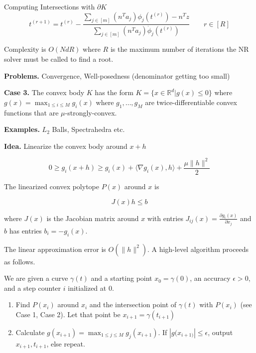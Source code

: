 \documentclass{beamer}
\begin{document}
\begin{frame}[allowframebreaks]{Computing Intersections with $\partial K$}
    \begin{equation*}
        t^{(r + 1)} = t^{(r)} - \frac {\sum_{j \in [m]} (n^T a_j) \phi_j(t^{(r)}) - n^T z } {\sum_{j \in [m]} (n^T a_j) \dot \phi_j(t^{(r)})} \qquad r \in [R]
    \end{equation*}

    Complexity is $O(NdR)$ where $R$ is the maximum number of iterations the NR solver must be called to find a root. 
    
    \textbf{Problems.} Convergence, Well-posedness (denominator getting too small)

    \framebreak
    
    \textbf{Case 3.} The convex body $K$ has the form $K = \{ x \in \mathbb R^d | g(x) \le 0 \}$ where $g(x) = \max_{1 \le i \le M} g_i(x)$ where $g_1, \dots, g_M$ are twice-differentiable convex functions that are $\mu$-strongly-convex. 
    
    \medskip
    
    \textbf{Examples.} $L_2$ Balls, Spectrahedra etc.
    
    \medskip
    
    \textbf{Idea.} Linearize the convex body around $x + h$
    
    $$0 \ge g_i(x + h) \ge g_i(x) + \langle \nabla g_i(x), h \rangle + \frac {\mu \| h \|^2}  2 $$
    
    The linearized convex polytope $P(x)$ around $x$ is 
    
    $$J(x) h \le b$$
    
    where $J(x)$ is the Jacobian matrix around $x$ with entries $J_{ij}(x) = \frac {\partial g_i(x)} {\partial x_j}$ and $b$ has entries $b_i = -g_i(x)$.
    
    \framebreak 
    
    The linear approximation error is $O(\| h \|^2)$.     A high-level algorithm proceeds as follows.
    
    \medskip

    We are given a curve $\gamma(t)$ and a starting point $x_0 = \gamma(0)$, an accuracy $\epsilon > 0$, and a step counter $i$ initialized at 0.
    
    \begin{enumerate}
        
        \item Find $P(x_i)$ around $x_i$ and the intersection point of $\gamma(t)$ with $P(x_i)$ (see Case 1, Case 2). Let that point be $x_{i + 1} = \gamma(t_{i + 1})$
        \item Calculate $g(x_{i + 1}) = \max_{1 \le j \le M} g_j(x_{i + 1})$. If $|g(x_{i + 1)}| \le \epsilon$, output $x_{i + 1}, t_{i + 1}$, else repeat. 
    \end{enumerate}
    
\end{frame}
\end{document}
